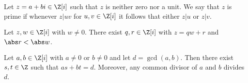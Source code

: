 \documentclass{article}
\begin{document}
\begin{definition}
    Let $z=a+bi\in\Z[i]$ such that $z$ is neither zero nor a unit. We say that $z$ is prime if 
    whenever $z|uv$ for $u,v\in\Z[i]$ it follows that either $z|u$ or $z|v$.
\end{definition}

\begin{theorem}[Lecture 13]
    Let $z,w\in\Z[i]$ with $w\not=0$. There exist $q,r\in\Z[i]$ with $z=qw+r$ and $\abs r<\abs w$.
\end{theorem}

\begin{theorem}
    Let $a,b\in\Z[i]$ with $a\not=0$ or $b\not=0$ and let $d=\gcd(a,b)$. Then there exist $s,t\in\Z$
    such that $as+bt=d$. Moreover, any common divisor of $a$ and $b$ divides $d$. 
\end{theorem}
\end{document}
